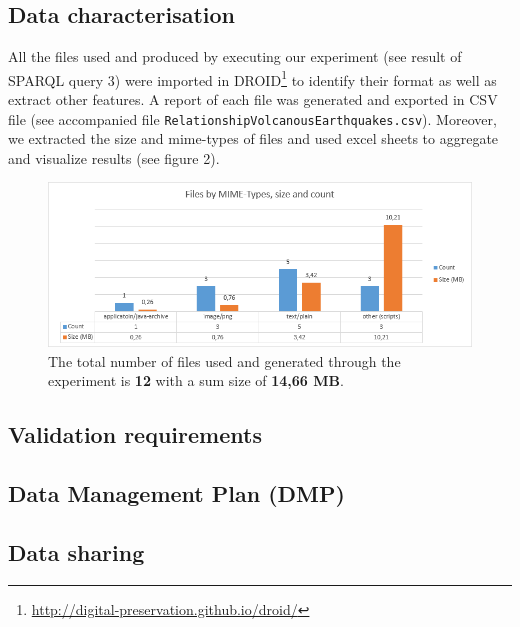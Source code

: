 \documentclass[12pt, a4paper]{article}
\begin{document}
\subsection{Data characterisation}
All the files used and produced by executing our experiment (see result of SPARQL query 3) were imported in DROID\footnote{\url{http://digital-preservation.github.io/droid/}} to identify their format as well as extract other features. A report of each file was generated and exported in CSV file (see accompanied file \verb|RelationshipVolcanousEarthquakes.csv|). Moreover, we extracted the size and mime-types of files and used excel sheets to aggregate and visualize results (see figure 2).
\begin{figure}[h]
  \centering
    \includegraphics[scale=0.85]{graph}
    \caption{The total number of files used and generated through the experiment is {\bf 12} with a sum size of {\bf 14,66 MB}.}
\end{figure}

\subsection{Validation requirements}

\subsection{Data Management Plan (DMP)}
\subsection{Data sharing}
\end{document}
